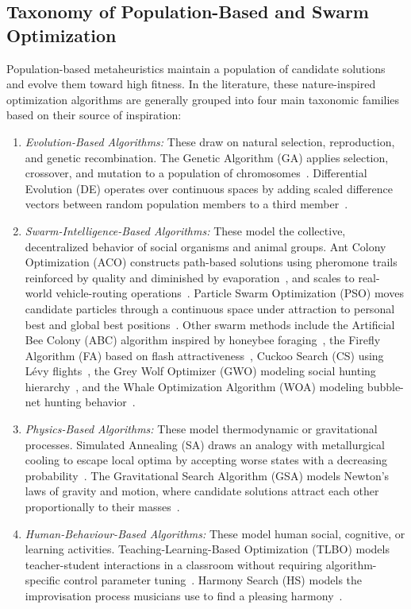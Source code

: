 \documentclass{ai-lab-report}
\begin{document}
\subsection{Taxonomy of Population-Based and Swarm Optimization}
Population-based metaheuristics maintain a population of candidate solutions and evolve them toward high fitness. In the literature, these nature-inspired optimization algorithms are generally grouped into four main taxonomic families based on their source of inspiration:
\begin{enumerate}
    \item \emph{Evolution-Based Algorithms:} These draw on natural selection, reproduction, and genetic recombination. The Genetic Algorithm (GA) applies selection, crossover, and mutation to a population of chromosomes~\citep{holland1975adaptation,goldberg1989genetic,katoch2021review}. Differential Evolution (DE) operates over continuous spaces by adding scaled difference vectors between random population members to a third member~\citep{storn1997de}.
    \item \emph{Swarm-Intelligence-Based Algorithms:} These model the collective, decentralized behavior of social organisms and animal groups. Ant Colony Optimization (ACO) constructs path-based solutions using pheromone trails reinforced by quality and diminished by evaporation~\citep{dorigo1996antsystem,dorigo1997acs}, and scales to real-world vehicle-routing operations~\citep{rizzoli2007aco}. Particle Swarm Optimization (PSO) moves candidate particles through a continuous space under attraction to personal best and global best positions~\citep{kennedy1995pso,shi1998modified,clerc2002particle}. Other swarm methods include the Artificial Bee Colony (ABC) algorithm inspired by honeybee foraging~\citep{karaboga2005abc}, the Firefly Algorithm (FA) based on flash attractiveness~\citep{yang2009firefly}, Cuckoo Search (CS) using L\'{e}vy flights~\citep{yang2009cuckoo}, the Grey Wolf Optimizer (GWO) modeling social hunting hierarchy~\citep{mirjalili2014greywolf}, and the Whale Optimization Algorithm (WOA) modeling bubble-net hunting behavior~\citep{mirjalili2016whale}.
    \item \emph{Physics-Based Algorithms:} These model thermodynamic or gravitational processes. Simulated Annealing (SA) draws an analogy with metallurgical cooling to escape local optima by accepting worse states with a decreasing probability~\citep{kirkpatrick1983sa}. The Gravitational Search Algorithm (GSA) models Newton's laws of gravity and motion, where candidate solutions attract each other proportionally to their masses~\citep{rashedi2009gsa}.
    \item \emph{Human-Behaviour-Based Algorithms:} These model human social, cognitive, or learning activities. Teaching-Learning-Based Optimization (TLBO) models teacher-student interactions in a classroom without requiring algorithm-specific control parameter tuning~\citep{rao2011tlbo}. Harmony Search (HS) models the improvisation process musicians use to find a pleasing harmony~\citep{geem2001harmony}.
\end{enumerate}
\end{document}
